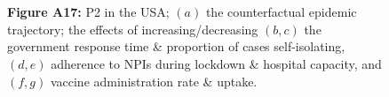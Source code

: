 \documentclass[paper=a4,fontsize=11pt]{article}
\begin{document}
\begin{figure}[!h]
  \\
  \hspace{1.76cm}
  \\
  \caption*{\textbf{Figure A17:} P2 in the USA; $(a)$ the counterfactual epidemic trajectory; the effects of increasing/decreasing $(b,c)$ the government response time \& proportion of cases self-isolating, $(d,e)$ adherence to NPIs during lockdown \& hospital capacity, and $(f,g)$ vaccine administration rate \& uptake.}
\end{figure}
\end{document}
